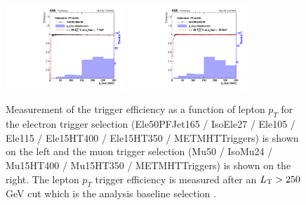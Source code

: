   \begin{figure}[!hbt]
    \begin{center}
    \includegraphics[width=0.4\textwidth]{Plots/trigger/LepPt_PFJet450_EffFit_test_HLT_EleORORHLT_MetOR.pdf}
    \includegraphics[width=0.4\textwidth]{Plots/trigger/LepPt_PFJet450_EffFit_test_HLT_MuORORHLT_MetOR.pdf}
  \end{center}
  \caption{Measurement of the trigger efficiency as a function of lepton $p_T$ for the
    electron trigger selection (Ele50PFJet165 / IsoEle27 / Ele105 / Ele115 /
    Ele15HT400 / Ele15HT350 / METMHTTriggers) is shown on the left and the muon trigger
    selection (Mu50 / IsoMu24 / Mu15HT400 / Mu15HT350 / METMHTTriggers) is shown on the
    right. The lepton $p_T$ trigger efficiency is measured after an $L_{\rm T}>250$\,GeV cut which is the analysis baseline selection \cite{trigger}.
  \label{fig:trig_eff_leptonPt}}
\end{figure}
